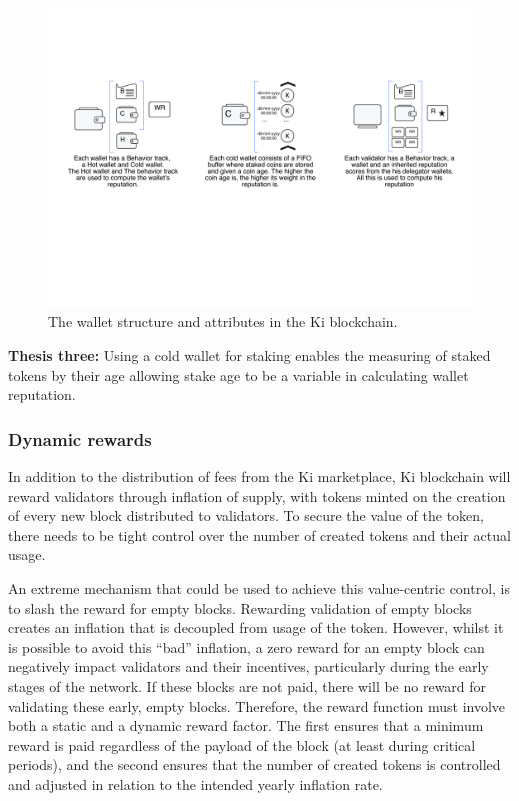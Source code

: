 \begin{figure}
	\includegraphics[width=\linewidth, trim= 1cm 8cm 1cm 5cm, clip]{Figures/wallets.pdf}
	\caption{The wallet structure and attributes in the Ki blockchain.}
	\label{fig:wallets}
\end{figure}

\textbf{Thesis three:} Using a cold wallet for staking enables the measuring of staked tokens by their age allowing stake age to be a variable in calculating wallet reputation.

\subsubsection{Dynamic rewards}
\label{sec:kiblockchainreward}
In addition to the distribution of fees from the Ki marketplace,  Ki blockchain will reward validators through inflation of supply, with tokens minted on the creation of every new block distributed to validators. To secure the value of the token, there needs to be tight control over the number of created tokens and their actual usage.

An extreme mechanism that could be used to achieve this value-centric control, is to slash the reward for empty blocks. Rewarding validation of empty blocks creates an inflation that is decoupled from usage of the token. However, whilst it is possible to avoid this “bad” inflation, a zero reward for an empty block can negatively impact validators and their incentives, particularly during the early stages of the network. If these blocks are not paid, there will be no reward for validating these early, empty blocks. Therefore, the reward function must involve both a static and a dynamic reward factor. The first ensures that a minimum reward is paid regardless of the payload of the block (at least during critical periods), and the second ensures that the number of created tokens is controlled and adjusted in relation to the intended yearly inflation rate.

